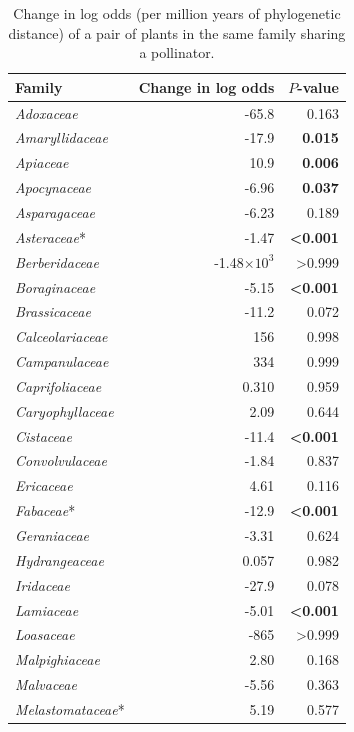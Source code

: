 \documentclass[12pt]{article}
\begin{document}
  \begin{table}[!h]
  \caption{
  \small Change in log odds (per million years of phylogenetic distance) of a pair of plants in the same family sharing a pollinator.}
  \small
  \label{family_slopes_pp}
  \begin{tabular}{|l  rr|}
    \hline
    Family  & Change in log odds & $P$-value \\
    \hline
    \emph{Adoxaceae} &  -65.8 & 0.163 \\
    \emph{Amaryllidaceae} &  -17.9 & \textbf{0.015} \\
    \emph{Apiaceae} &  10.9  & \textbf{0.006} \\
    \emph{Apocynaceae} &  -6.96  & \textbf{0.037} \\
    \emph{Asparagaceae} &  -6.23  & 0.189 \\
    \emph{Asteraceae}* &  -1.47  & \textbf{\textless0.001} \\
    \emph{Berberidaceae} &  -1.48$\times10^3$ & \textgreater0.999 \\
    \emph{Boraginaceae} &  -5.15  & \textbf{\textless0.001} \\
    \emph{Brassicaceae} &  -11.2 & 0.072 \\
    \emph{Calceolariaceae} &  156 & 0.998 \\
    \emph{Campanulaceae} &  334 & 0.999 \\
    \emph{Caprifoliaceae} &  0.310 & 0.959 \\
    \emph{Caryophyllaceae} &  2.09 & 0.644 \\
    \emph{Cistaceae} &  -11.4 & \textbf{\textless0.001} \\
    \emph{Convolvulaceae} &  -1.84  & 0.837 \\
    \emph{Ericaceae} &  4.61 & 0.116 \\
    \emph{Fabaceae}* &  -12.9 & \textbf{\textless0.001} \\
    \emph{Geraniaceae} &  -3.31  & 0.624 \\
    \emph{Hydrangeaceae} &  0.057 & 0.982 \\
    \emph{Iridaceae} &  -27.9 & 0.078 \\
    \emph{Lamiaceae} &  -5.01  & \textbf{\textless0.001} \\
    \emph{Loasaceae} &  -865  & \textgreater0.999 \\
    \emph{Malpighiaceae} &  2.80 & 0.168 \\
    \emph{Malvaceae} &  -5.56  & 0.363 \\
    \emph{Melastomataceae}* &  5.19 & 0.577 \\

\end{tabular}
\end{table}
\end{document}
